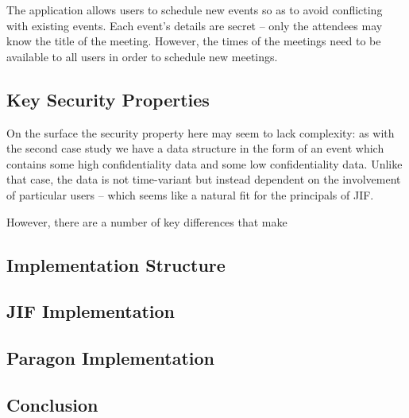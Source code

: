 The application allows users to schedule new events so as to avoid conflicting with existing events. Each event's details are secret -- only the attendees may know the title of the meeting. However, the times of the meetings need to be available to all users in order to schedule new meetings.

\subsection{Key Security Properties}

On the surface the security property here may seem to lack complexity: as with the second case study we have a data structure in the form of an event which contains some high confidentiality data and some low confidentiality data. Unlike that case, the data is not time-variant but instead dependent on the involvement of particular users -- which seems like a natural fit for the principals of JIF.

However, there are a number of key differences that make 

\subsection{Implementation Structure}

\subsection{JIF Implementation}

\subsection{Paragon Implementation}

\subsection{Conclusion}